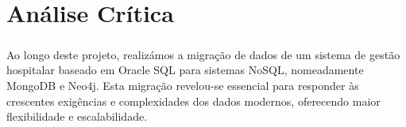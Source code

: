 \chapter{Análise Crítica}
\paragraph{}










Ao longo deste projeto, realizámos a migração de dados de um sistema de gestão hospitalar baseado em Oracle SQL para sistemas NoSQL, nomeadamente MongoDB e Neo4j. Esta migração revelou-se essencial para responder às crescentes exigências e complexidades dos dados modernos, oferecendo maior flexibilidade e escalabilidade.


